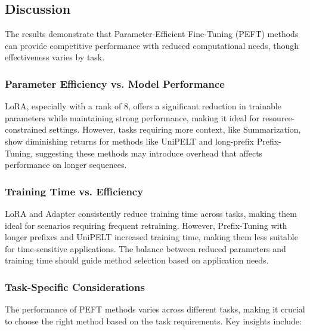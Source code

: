 \subsection{Discussion}

The results demonstrate that Parameter-Efficient Fine-Tuning (PEFT) methods can provide competitive performance with reduced computational needs, though effectiveness varies by task.

\subsubsection{\textbf{Parameter Efficiency vs. Model Performance}}
LoRA, especially with a rank of 8, offers a significant reduction in trainable parameters while maintaining strong performance, making it ideal for resource-constrained settings. However, tasks requiring more context, like Summarization, show diminishing returns for methods like UniPELT and long-prefix Prefix-Tuning, suggesting these methods may introduce overhead that affects performance on longer sequences.

\subsubsection{\textbf{Training Time vs. Efficiency}}
LoRA and Adapter consistently reduce training time across tasks, making them ideal for scenarios requiring frequent retraining. However, Prefix-Tuning with longer prefixes and UniPELT increased training time, making them less suitable for time-sensitive applications. The balance between reduced parameters and training time should guide method selection based on application needs.

\subsubsection{\textbf{Task-Specific Considerations}}
The performance of PEFT methods varies across different tasks, making it crucial to choose the right method based on the task requirements. Key insights include:

